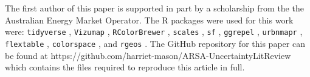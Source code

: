 \documentclass[
  12pt]{article}
\begin{document}
The first author of this paper is supported in part by a scholarship
from the the Australian Energy Market Operator. The R packages were used
for this work were: \texttt{tidyverse} \citep{tidyverse},
\texttt{Vizumap} \citep{Vizumap}, \texttt{RColorBrewer}
\citep{RColorBrewer}, \texttt{scales} \citep{scales}, \texttt{sf}
\citep{sf}, \texttt{ggrepel} \citep{ggrepel}, \texttt{urbnmapr}
\citep{urbnmapr}, \texttt{flextable} \citep{flextable},
\texttt{colorspace} \citep{colorspace}, and \texttt{rgeos}
\citep{rgeos}. The GitHub repository for this paper can be found at
https://github.com/harriet-mason/ARSA-UncertaintyLitReview which
contains the files required to reproduce this article in full.


\renewcommand\refname{Bibliography}

\end{document}
